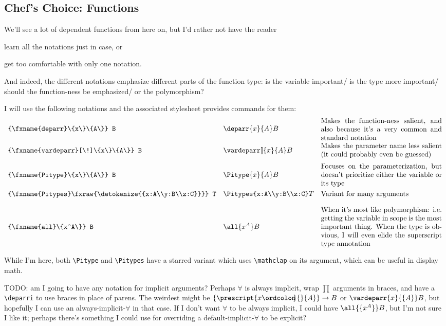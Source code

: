 \documentclass[11pt]{article} %
\makeatletter
\newcommand\ltextcell[1]{\begin{array}[c]{@{}l@{}}\textstyle {#1}\end{array}}
\theoremstyle{definition}
\theoremstyle{remark}
\makeatother
\begin{document}
\subsection{Chef's Choice: Functions}


We'll see a lot of dependent functions from here on, but I'd rather not have the reader
  \begin{enumerate*}[label=\textit{\roman*})]
  \item learn all the notations just in case, or
  \item get too comfortable with only one notation.
  \end{enumerate*}
And indeed, the different notations emphasize different parts of the function type: is the variable important\qcomma/ is the type more important\qcomma/ should the function-ness be emphasized\qcomma/ or the polymorphism?

I will use the following notations and the associated stylesheet provides commands for them:
\[\begin{array}{llp{6cm}}
  \verb|\deparr{x}{A} B| & \ltextcell{\deparr{x}{A} B} &
    \parbox{6cm}{Makes the function-ness salient, and also because it's a very common and standard notation} \\
  \verb|\vardeparr[\!]{x}{A} B| & \ltextcell{\vardeparr[\!]{x}{A} B} &
    \parbox{6cm}{Makes the parameter name less salient (it could probably even be guessed)} \\
  \verb|\Pitype{x}{A} B| & \ltextcell{\Pitype{x}{A} B} &
    \parbox{6cm}{Focuses on the parameterization, but doesn't prioritize either the variable or its type} \\
  \verb|\Pitypes{x:A\\y:B\\z:C} T| & \ltextcell{\Pitypes{x:A\\y:B\\z:C} T} &
    \parbox{6cm}{Variant for many arguments} \\
  \verb|\all{x^A} B| & \ltextcell{\all{x^A} B} &
    \parbox{6cm}{When it's most like polymorphism: i.e.\ getting the variable in scope is the most important thing.
    When the type is obvious, I will even elide the superscript type annotation} \\
\end{array}\]
While I'm here, both \verb!\Pitype! and \verb!\Pitypes! have a starred variant which uses \verb!\mathclap! on its argument, which can be useful in display math.


TODO: am I going to have any notation for implicit arguments?
Perhaps $\forall$ is always implicit, wrap $\prod$ arguments in braces, and have a \verb|\deparri| to use braces in place of parens.
The weirdest might be $\{\prescript{x\ordcolon\!\!}{}{A}\} \to B$ or $\vardeparr{x}{\{A\}}B$, but hopefully I can use an always-implicit-$\forall$ in that case.
If I don't want $\forall$ to be always implicit, I could have $\all{\{x^A\}}B$, but I'm not sure I like it; perhaps there's something I could use for overriding a default-implicit-$\forall$ to be explicit?
\end{document}
